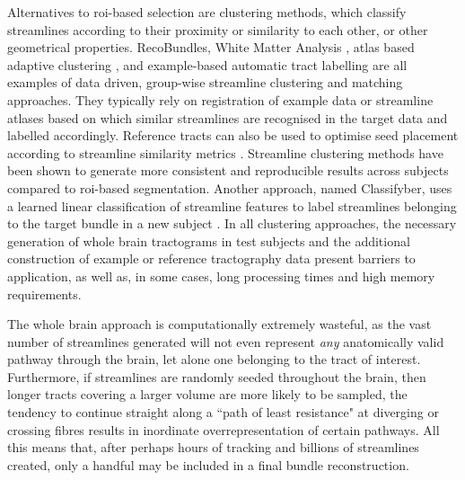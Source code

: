 Alternatives to \gls{roi}-based selection are clustering methods, which classify streamlines according to their proximity or similarity to each other, or other geometrical properties.
RecoBundles\autocite{Garyfallidis2018}, White Matter Analysis \autocite{ODonnell2017, ODonnell2007}, atlas based adaptive clustering \autocite{Tunc2014}, and example-based automatic tract labelling \autocite{Yoo2015} are all examples of data driven, group-wise streamline clustering and matching approaches.
They typically rely on registration of example data or streamline atlases based on which similar streamlines are recognised in the target data and labelled accordingly.
Reference tracts can also be used to optimise seed placement according to streamline similarity metrics \autocite{Clayden2006,Clayden2009}.
Streamline clustering methods have been shown to generate more consistent and reproducible results across subjects compared to \gls{roi}-based segmentation\autocite{Sydnor2018}.
Another approach, named Classifyber, uses a learned linear classification of streamline features to label streamlines belonging to the target bundle in a new subject \autocite{Berto2021}.
In all clustering approaches, the necessary generation of whole brain tractograms in test subjects and the additional construction of example or reference tractography data present barriers to application, as well as, in some cases, long processing times and high memory requirements\autocite{Wasserthal2018}.

The whole brain approach is computationally extremely wasteful, as the vast number of streamlines generated will not even represent \textit{any} anatomically valid pathway through the brain, let alone one belonging to the tract of interest.
Furthermore, if streamlines are randomly seeded throughout the brain, then longer tracts covering a larger volume are more likely to be sampled, the tendency to continue straight along a ``path of least resistance" at diverging or crossing fibres results in inordinate overrepresentation of certain pathways\autocite{Smith2013}.
All this means that, after perhaps hours of tracking and billions of streamlines created, only a handful may be included in a final bundle reconstruction.

